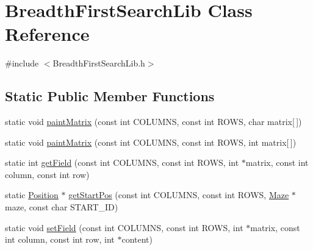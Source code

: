 \hypertarget{class_breadth_first_search_lib}{\section{Breadth\-First\-Search\-Lib Class Reference}
\label{class_breadth_first_search_lib}
}


{\ttfamily \#include $<$Breadth\-First\-Search\-Lib.\-h$>$}

\subsection*{Static Public Member Functions}
\begin{DoxyCompactItemize}
\item 
static void \hyperlink{class_breadth_first_search_lib_af70b8250ad3c10b8b71c5913b46f8fca}{paint\-Matrix} (const int C\-O\-L\-U\-M\-N\-S, const int R\-O\-W\-S, char matrix\mbox{[}$\,$\mbox{]})
\item 
static void \hyperlink{class_breadth_first_search_lib_acb4a80e7b47617c9ea478a6e5b286015}{paint\-Matrix} (const int C\-O\-L\-U\-M\-N\-S, const int R\-O\-W\-S, int matrix\mbox{[}$\,$\mbox{]})
\item 
static int \hyperlink{class_breadth_first_search_lib_a590126086844fa974397714536ce3cbb}{get\-Field} (const int C\-O\-L\-U\-M\-N\-S, const int R\-O\-W\-S, int $\ast$matrix, const int column, const int row)
\item 
static \hyperlink{class_position}{Position} $\ast$ \hyperlink{class_breadth_first_search_lib_a2426f93e31804b1e07ee3101c9507d63}{get\-Start\-Pos} (const int C\-O\-L\-U\-M\-N\-S, const int R\-O\-W\-S, \hyperlink{class_maze}{Maze} $\ast$maze, const char S\-T\-A\-R\-T\-\_\-\-I\-D)
\item 
static void \hyperlink{class_breadth_first_search_lib_a21d08cb771c1cff3fb22863e0b345ab0}{set\-Field} (const int C\-O\-L\-U\-M\-N\-S, const int R\-O\-W\-S, int $\ast$matrix, const int column, const int row, int $\ast$content)
\end{DoxyCompactItemize}


